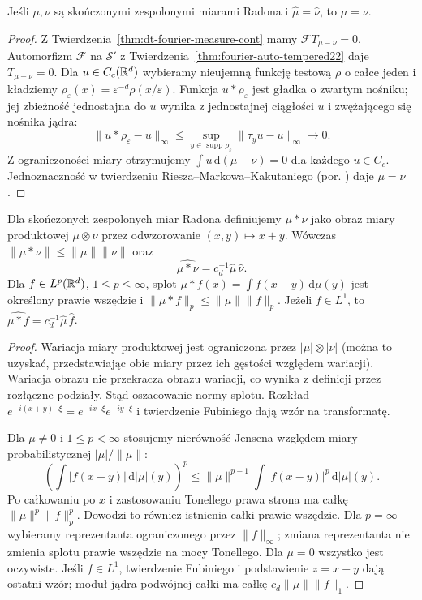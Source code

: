 \begin{twierdzenie}
\label{thm:dt-fourier-measure-unique}
Jeśli $\mu,\nu$ są skończonymi zespolonymi miarami Radona
i $\widehat\mu=\widehat\nu$, to $\mu=\nu$.
\end{twierdzenie}
\begin{proof}
Z Twierdzenia~\ref{thm:dt-fourier-measure-cont} mamy
$\mathcal FT_{\mu-\nu}=0$. Automorfizm $\mathcal F$ na
$\mathcal S'$ z Twierdzenia~\ref{thm:fourier-auto-tempered22}
daje $T_{\mu-\nu}=0$.
Dla $u\in C_c(\mathbb R^d)$ wybieramy nieujemną funkcję testową
$\rho$ o całce jeden i kładziemy
$\rho_\varepsilon(x)=\varepsilon^{-d}\rho(x/\varepsilon)$.
Funkcja $u*\rho_\varepsilon$ jest gładka o zwartym nośniku;
jej zbieżność jednostajna do $u$ wynika z jednostajnej
ciągłości $u$ i zwężającego się nośnika jądra:
\[
 \|u*\rho_\varepsilon-u\|_\infty
 \le\sup_{y\in\operatorname{supp}\rho_\varepsilon}
        \|\tau_yu-u\|_\infty\to0.
\]
Z ograniczoności miary otrzymujemy
$\int u\,\mathrm d(\mu-\nu)=0$ dla każdego $u\in C_c$.
Jednoznaczność w twierdzeniu Riesza--Markowa--Kakutaniego
(por. )
daje $\mu=\nu$.
\end{proof}

\begin{stwierdzenie}
\label{prop:dt-fourier-measure-conv}
Dla skończonych zespolonych miar Radona definiujemy
$\mu*\nu$ jako obraz miary produktowej $\mu\otimes\nu$
przez odwzorowanie $(x,y)\mapsto x+y$. Wówczas
$\|\mu*\nu\|\le\|\mu\|\|\nu\|$ oraz
\[
 \widehat{\mu*\nu}=c_d^{-1}\widehat\mu\,\widehat\nu.
\]
Dla $f\in L^p(\mathbb R^d)$, $1\le p\le\infty$, splot
$\mu*f(x)=\int f(x-y)\,\mathrm d\mu(y)$ jest określony
prawie wszędzie i $\|\mu*f\|_p\le\|\mu\|\|f\|_p$.
Jeżeli $f\in L^1$, to
$\widehat{\mu*f}=c_d^{-1}\widehat\mu\,\widehat f$.
\end{stwierdzenie}
\begin{proof}
Wariacja miary produktowej jest ograniczona przez
$|\mu|\otimes|\nu|$ (można to uzyskać, przedstawiając
obie miary przez ich gęstości względem wariacji).
Wariacja obrazu nie przekracza obrazu wariacji, co
wynika z definicji przez rozłączne podziały.
Stąd oszacowanie normy splotu.
Rozkład $e^{-i(x+y)\cdot\xi}=e^{-ix\cdot\xi}e^{-iy\cdot\xi}$
i twierdzenie Fubiniego dają wzór na transformatę.

Dla $\mu\ne0$ i $1\le p<\infty$ stosujemy nierówność
Jensena względem miary probabilistycznej $|\mu|/\|\mu\|$:
\[
 \left(\int|f(x-y)|\,\mathrm d|\mu|(y)\right)^p
 \le \|\mu\|^{p-1}\int|f(x-y)|^p\,\mathrm d|\mu|(y).
\]
Po całkowaniu po $x$ i zastosowaniu Tonellego prawa strona
ma całkę $\|\mu\|^p\|f\|_p^p$. Dowodzi to również istnienia
całki prawie wszędzie. Dla $p=\infty$ wybieramy
reprezentanta ograniczonego przez $\|f\|_\infty$;
zmiana reprezentanta nie zmienia splotu prawie wszędzie
na mocy Tonellego. Dla $\mu=0$ wszystko jest oczywiste.
Jeśli $f\in L^1$, twierdzenie Fubiniego i podstawienie
$z=x-y$ dają ostatni wzór; moduł jądra podwójnej całki
ma całkę $c_d\|\mu\|\|f\|_1$.
\end{proof}

